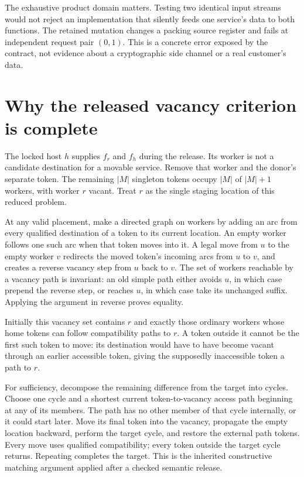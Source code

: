 \documentclass[11pt,letterpaper]{article}
\theoremstyle{definition}\newtheorem{definition}[theorem]{Definition}
\theoremstyle{remark}\newtheorem{remark}[theorem]{Remark}
\begin{document}
The exhaustive product domain matters. Testing two identical input streams would not reject an implementation that silently feeds one service's data to both functions. The retained mutation changes a packing source register and fails at independent request pair $(0,1)$. This is a concrete error exposed by the contract, not evidence about a cryptographic side channel or a real customer's data.

\section{Why the released vacancy criterion is complete}
\label{app:reach}
The locked host $h$ supplies $f_r$ and $f_h$ during the release. Its worker is not a candidate destination for a movable service. Remove that worker and the donor's separate token. The remaining $|M|$ singleton tokens occupy $|M|$ of $|M|+1$ workers, with worker $r$ vacant. Treat $r$ as the single staging location of this reduced problem.

At any valid placement, make a directed graph on workers by adding an arc from every qualified destination of a token to its current location. An empty worker follows one such arc when that token moves into it. A legal move from $u$ to the empty worker $v$ redirects the moved token's incoming arcs from $u$ to $v$, and creates a reverse vacancy step from $u$ back to $v$. The set of workers reachable by a vacancy path is invariant: an old simple path either avoids $u$, in which case prepend the reverse step, or reaches $u$, in which case take its unchanged suffix. Applying the argument in reverse proves equality.

Initially this vacancy set contains $r$ and exactly those ordinary workers whose home tokens can follow compatibility paths to $r$. A token outside it cannot be the first such token to move: its destination would have to have become vacant through an earlier accessible token, giving the supposedly inaccessible token a path to $r$.

For sufficiency, decompose the remaining difference from the target into cycles. Choose one cycle and a shortest current token-to-vacancy access path beginning at any of its members. The path has no other member of that cycle internally, or it could start later. Move its final token into the vacancy, propagate the empty location backward, perform the target cycle, and restore the external path tokens. Every move uses qualified compatibility; every token outside the target cycle returns. Repeating completes the target. This is the inherited constructive matching argument applied after a checked semantic release.
\end{document}
